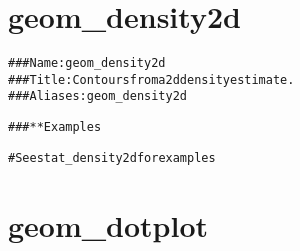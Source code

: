 \documentclass[a4paper,titlepage]{tufte-handout}\usepackage[]{graphicx}\usepackage[]{color}
\makeatletter
\newenvironment{kframe}{%
 \def\at@end@of@kframe{}%
 \ifinner\ifhmode%
  \def\at@end@of@kframe{\end{minipage}}%
  \begin{minipage}{\columnwidth}%
 \fi\fi%
 \def\FrameCommand##1{\hskip\@totalleftmargin \hskip-\fboxsep
 \colorbox{shadecolor}{##1}\hskip-\fboxsep
     \hskip-\linewidth \hskip-\@totalleftmargin \hskip\columnwidth}%
 \MakeFramed {\advance\hsize-\width
   \@totalleftmargin\z@ \linewidth\hsize
   \@setminipage}}%
 {\par\unskip\endMakeFramed%
 \at@end@of@kframe}
\newenvironment{knitrout}{}{} %
\makeatother
\begin{document}
\section{geom\_density2d}

\begin{knitrout}
\color{fgcolor}\begin{kframe}
\begin{alltt}
### Name: geom_density2d
### Title: Contours from a 2d density estimate.
### Aliases: geom_density2d

### ** Examples

# See stat_density2d for examples



\end{alltt}
\end{kframe}
\end{knitrout}



\section{geom\_dotplot}
\end{document}
